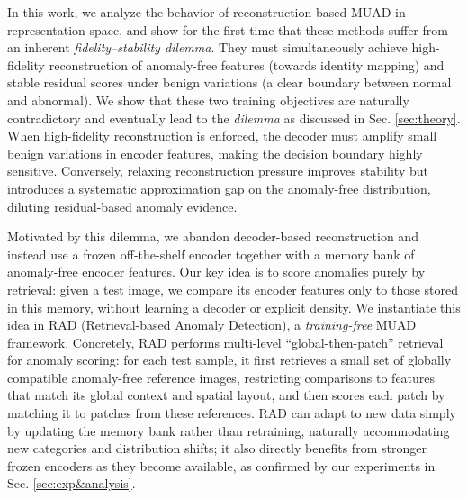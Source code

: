 \documentclass{article}
\theoremstyle{plain}
\theoremstyle{definition}
\theoremstyle{remark}
\begin{document}
In this work, we analyze the behavior of reconstruction-based MUAD in representation space, and show for the first time that these methods suffer from an inherent \textit{fidelity–stability dilemma}.
They must simultaneously achieve high-fidelity reconstruction of anomaly-free features (towards identity mapping) and stable residual scores under benign variations (a clear boundary between normal and abnormal). We show that these two training objectives are naturally contradictory and eventually lead to the \emph{dilemma} as discussed in Sec. \ref{sec:theory}. When high-fidelity reconstruction is enforced, the decoder must amplify small benign variations in encoder features, making the decision boundary highly sensitive. Conversely, relaxing reconstruction pressure improves stability but introduces a systematic approximation gap on the anomaly-free distribution, diluting residual-based anomaly evidence. 


Motivated by this dilemma, we abandon decoder-based reconstruction and instead use a frozen off-the-shelf encoder together with a memory bank of anomaly-free encoder features.  Our key idea is to score anomalies purely by retrieval: given a test image, we compare its encoder features only to those stored in this memory, without learning a decoder or explicit density. We instantiate this idea in RAD (Retrieval-based Anomaly Detection), a \emph{training-free} MUAD framework. Concretely, RAD performs multi-level “global-then-patch” retrieval for anomaly scoring: for each test sample, it first retrieves a small set of globally compatible anomaly-free reference images, restricting comparisons to features that match its global context and spatial layout, and then scores each patch by matching it to patches from these references. RAD can adapt to new data simply by updating the memory bank rather than retraining, naturally accommodating new categories and distribution shifts; it also directly benefits from stronger frozen encoders as they become available, as confirmed by our experiments in Sec. \ref{sec:exp&analysis}.
\end{document}
